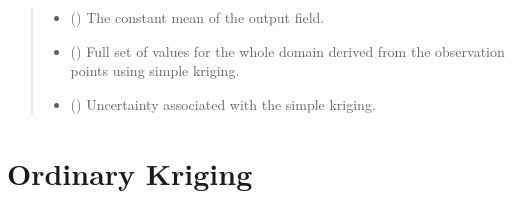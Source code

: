 \documentclass[letterpaper,10pt,english]{sphinxmanual}
\begin{document}
\begin{fulllineitems}
\begin{quote}
\begin{description}
\begin{itemize}
\item {}
\sphinxAtStartPar
{} () \textendash{} The constant mean of the output field.

\end{itemize}

\sphinxAtStartPar
{}

\sphinxAtStartPar
\begin{itemize}
\item {}
\sphinxAtStartPar
{} () \textendash{} Full set of values for the whole domain derived from the observation
points using simple kriging.

\item {}
\sphinxAtStartPar
{} () \textendash{} Uncertainty associated with the simple kriging.

\end{itemize}


\end{description}\end{quote}

\end{fulllineitems}



\section{Ordinary Kriging}
\label{\detokenize{kriging:ordinary-kriging}}
\end{document}

